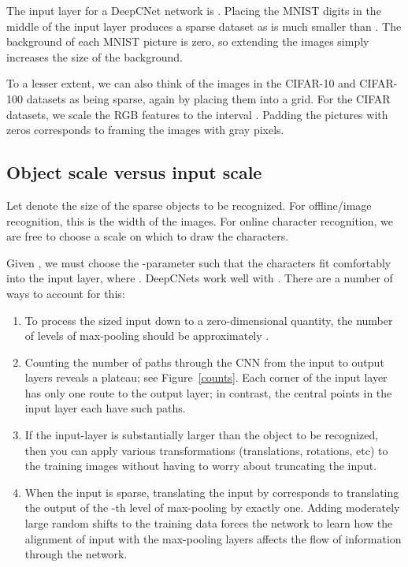 \documentclass{article}
\numberwithin{equation}{subsection}
\newenvironment{circlist}{
  \begin{enumerate}[]
  \setlength{\itemsep}{0pt}
  \setlength{\parskip}{0pt}
  \setlength{\parsep}{0pt}
}{\end{enumerate}}
\begin{document}
The input layer for a DeepCNet network is . Placing the MNIST digits in the middle of the input layer produces a sparse dataset as  is much smaller than . The background of each MNIST picture is zero, so extending the images simply increases the size of the background.

To a lesser extent, we can also think of the  images in the CIFAR-10 and CIFAR-100 datasets as being sparse, again by placing them into a  grid. For the CIFAR datasets, we scale the RGB features to the interval . Padding the pictures with zeros corresponds to framing the images with gray pixels.


\subsection{Object scale versus input scale}\label{nN}
Let  denote the size of the sparse objects to be recognized.
For offline/image recognition, this is the width of the images.
For online character recognition, we are free to choose a scale  on which to draw the characters.

Given , we must choose the -parameter such that the characters fit comfortably into the  input layer, where . DeepCNets work well with . There are a number of ways to account for this:
\begin{circlist}
\item To process the  sized input down to a zero-dimensional quantity, the number  of levels of  max-pooling should be approximately .
\item Counting the number of paths through the CNN from the input to output layers reveals a plateau; see Figure~\ref{counts}. Each corner of the input layer has only one route to the output layer; in contrast, the central  points in the input layer each have  such paths.
\item If the input-layer is substantially larger than the object to be recognized, then you can apply various transformations (translations, rotations, etc) to the training images without having to worry about truncating the input.
\item When the input is sparse, translating the input by  corresponds to translating the output of the -th level of  max-pooling by exactly one. Adding moderately large random shifts to the training data forces the network to learn how the alignment of input with the max-pooling layers affects the flow of information through the network.
\end{circlist}
\end{document}
